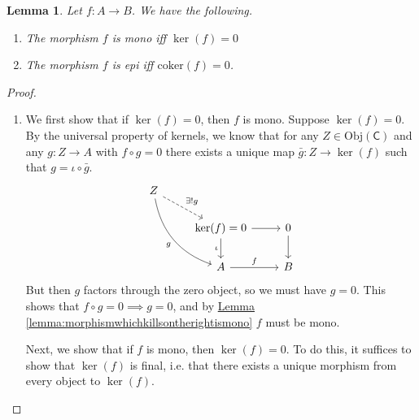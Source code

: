 \documentclass[a4paper]{report}
\newcommand{\Obj}{\mathrm{Obj}}
\newcommand{\coker}{\mathrm{coker}}
\theoremstyle{definition}
\theoremstyle{plain}
\newtheorem{lemma}{Lemma}[section]
\theoremstyle{remark}
\begin{document}
\begin{lemma}
  \label{lemma:monoifkernelzeroepiifcokerzero}
  Let $f\colon A \to B$. We have the following. 
  \begin{enumerate}
    \item The morphism $f$ is mono iff $\ker(f) = 0$ \label{part:monoifkernelzeroepiifcokerzero1}
    \item The morphism $f$ is epi iff $\coker(f) = 0$. \label{part:monoifkernelzeroepiifcokerzero2}
  \end{enumerate}
\end{lemma}
\begin{proof}
  $\,$
  \begin{enumerate}
    \item We first show that if $\ker(f) = 0$, then $f$ is mono. Suppose $\ker(f) = 0$. By the universal property of kernels, we know that for any $Z \in \Obj(\mathsf{C})$ and any $g\colon Z \to A$ with $f \circ g = 0$ there exists a unique map $\bar{g}\colon Z \to \ker(f)$ such that $g = \iota \circ \bar{g}$.
      \begin{equation*}
        \begin{tikzcd}
          Z
          \arrow[rdd, bend right, swap, "g"]
          \arrow[rd, dashed, "\exists!g"]
          \\
          & \ker(f) = 0
          \arrow[r]
          \arrow[d, swap, "\iota"]
          & 0
          \arrow[d]
          \\
          & A
          \arrow[r, "f"]
          & B
        \end{tikzcd}
      \end{equation*}
      But then $g$ factors through the zero object, so we must have $g = 0$. This shows that $f \circ g = 0 \implies g = 0$, and by \hyperref[lemma:morphismwhichkillsontherightismono]{Lemma \ref*{lemma:morphismwhichkillsontherightismono}} $f$ must be mono.

      Next, we show that if $f$ is mono, then $\ker(f) = 0$. To do this, it suffices to show that $\ker(f)$ is final, i.e. that there exists a unique morphism from every object to $\ker(f)$.


\end{enumerate}
\end{proof}
\end{document}
